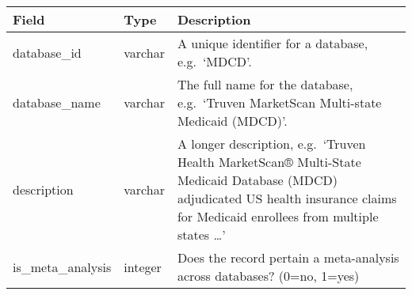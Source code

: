 \documentclass[
]{article}
\begin{document}
\begin{longtable}[]{@{}lll@{}}
\toprule
\begin{minipage}[b]{0.23\columnwidth}\raggedright
Field\strut
\end{minipage} & \begin{minipage}[b]{0.18\columnwidth}\raggedright
Type\strut
\end{minipage} & \begin{minipage}[b]{0.50\columnwidth}\raggedright
Description\strut
\end{minipage}\tabularnewline
\midrule
\endhead
\begin{minipage}[t]{0.23\columnwidth}\raggedright
database\_id\strut
\end{minipage} & \begin{minipage}[t]{0.18\columnwidth}\raggedright
varchar\strut
\end{minipage} & \begin{minipage}[t]{0.50\columnwidth}\raggedright
A unique identifier for a database, e.g.~`MDCD'.\strut
\end{minipage}\tabularnewline
\begin{minipage}[t]{0.23\columnwidth}\raggedright
database\_name\strut
\end{minipage} & \begin{minipage}[t]{0.18\columnwidth}\raggedright
varchar\strut
\end{minipage} & \begin{minipage}[t]{0.50\columnwidth}\raggedright
The full name for the database, e.g.~`Truven MarketScan Multi-state
Medicaid (MDCD)'.\strut
\end{minipage}\tabularnewline
\begin{minipage}[t]{0.23\columnwidth}\raggedright
description\strut
\end{minipage} & \begin{minipage}[t]{0.18\columnwidth}\raggedright
varchar\strut
\end{minipage} & \begin{minipage}[t]{0.50\columnwidth}\raggedright
A longer description, e.g.~`Truven Health MarketScan® Multi-State
Medicaid Database (MDCD) adjudicated US health insurance claims for
Medicaid enrollees from multiple states \ldots{}'\strut
\end{minipage}\tabularnewline
\begin{minipage}[t]{0.23\columnwidth}\raggedright
is\_meta\_analysis\strut
\end{minipage} & \begin{minipage}[t]{0.18\columnwidth}\raggedright
integer\strut
\end{minipage} & \begin{minipage}[t]{0.50\columnwidth}\raggedright
Does the record pertain a meta-analysis across databases? (0=no,
1=yes)\strut
\end{minipage}\tabularnewline
\bottomrule
\end{longtable}
\end{document}
